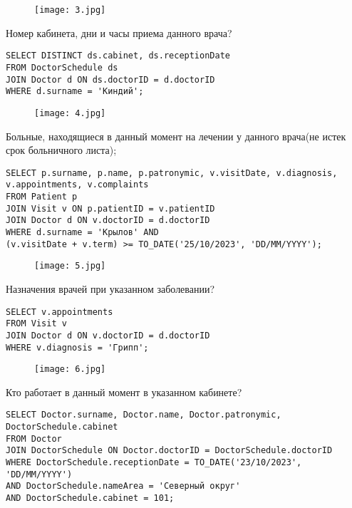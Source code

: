 \documentclass{article}
\begin{document}
\begin{figure}[h]
\centering
\texttt{[image: 3.jpg]}
\label{fig:mpr}
\end{figure}

Номер кабинета, дни и часы приема данного врача?

\begin{verbatim}
SELECT DISTINCT ds.cabinet, ds.receptionDate
FROM DoctorSchedule ds
JOIN Doctor d ON ds.doctorID = d.doctorID
WHERE d.surname = 'Киндий';
\end{verbatim}

\begin{figure}[h]
\centering
\texttt{[image: 4.jpg]}
\label{fig:mpr}
\end{figure}

Больные, находящиеся в данный момент на лечении у данного врача(не истек срок больничного листа);

\begin{verbatim}
SELECT p.surname, p.name, p.patronymic, v.visitDate, v.diagnosis, 
v.appointments, v.complaints
FROM Patient p
JOIN Visit v ON p.patientID = v.patientID
JOIN Doctor d ON v.doctorID = d.doctorID
WHERE d.surname = 'Крылов' AND 
(v.visitDate + v.term) >= TO_DATE('25/10/2023', 'DD/MM/YYYY');   
\end{verbatim}

\begin{figure}[h]
\centering
\texttt{[image: 5.jpg]}
\label{fig:mpr}
\end{figure}

Назначения врачей при указанном заболевании?

\begin{verbatim}
SELECT v.appointments
FROM Visit v
JOIN Doctor d ON v.doctorID = d.doctorID
WHERE v.diagnosis = 'Грипп';
\end{verbatim}

\begin{figure}[h]
\centering
\texttt{[image: 6.jpg]}
\label{fig:mpr}
\end{figure}

Кто работает в данный момент в указанном кабинете?

\begin{verbatim}
SELECT Doctor.surname, Doctor.name, Doctor.patronymic, 
DoctorSchedule.cabinet
FROM Doctor
JOIN DoctorSchedule ON Doctor.doctorID = DoctorSchedule.doctorID
WHERE DoctorSchedule.receptionDate = TO_DATE('23/10/2023', 'DD/MM/YYYY') 
AND DoctorSchedule.nameArea = 'Северный округ' 
AND DoctorSchedule.cabinet = 101; 
\end{verbatim}
\end{document}
